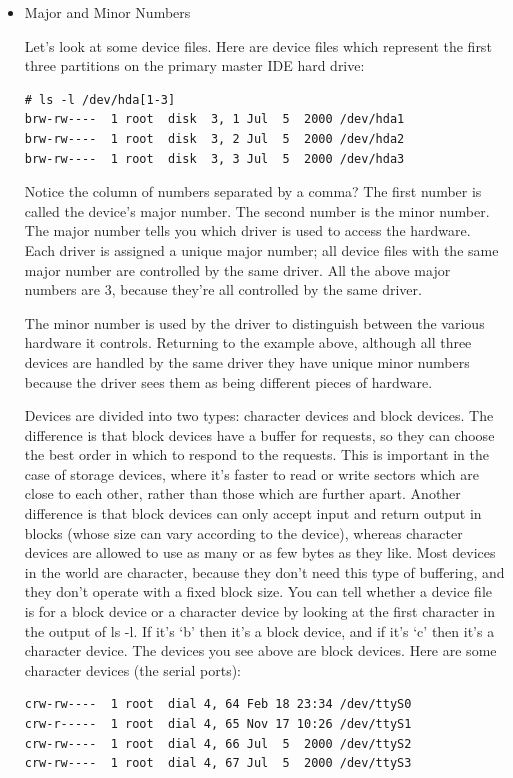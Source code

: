 \documentclass[11pt]{article}
\begin{document}
\begin{itemize}
\item Major and Minor Numbers
\label{sec-5-6-0-1}

Let's look at some device files. Here are device files which represent the first three partitions on the primary master IDE hard drive:

\begin{verbatim}
# ls -l /dev/hda[1-3]
brw-rw----  1 root  disk  3, 1 Jul  5  2000 /dev/hda1
brw-rw----  1 root  disk  3, 2 Jul  5  2000 /dev/hda2
brw-rw----  1 root  disk  3, 3 Jul  5  2000 /dev/hda3
\end{verbatim}

Notice the column of numbers separated by a comma? The first number is called the device's major number. The second number is the minor number. The major number tells you which driver is used to access the hardware. Each driver is assigned a unique major number; all device files with the same major number are controlled by the same driver. All the above major numbers are 3, because they're all controlled by the same driver.

The minor number is used by the driver to distinguish between the various hardware it controls. Returning to the example above, although all three devices are handled by the same driver they have unique minor numbers because the driver sees them as being different pieces of hardware.

Devices are divided into two types: character devices and block devices. The difference is that block devices have a buffer for requests, so they can choose the best order in which to respond to the requests. This is important in the case of storage devices, where it's faster to read or write sectors which are close to each other, rather than those which are further apart. Another difference is that block devices can only accept input and return output in blocks (whose size can vary according to the device), whereas character devices are allowed to use as many or as few bytes as they like. Most devices in the world are character, because they don't need this type of buffering, and they don't operate with a fixed block size. You can tell whether a device file is for a block device or a character device by looking at the first character in the output of ls -l. If it's `b' then it's a block device, and if it's `c' then it's a character device. The devices you see above are block devices. Here are some character devices (the serial ports):

\begin{verbatim}
crw-rw----  1 root  dial 4, 64 Feb 18 23:34 /dev/ttyS0
crw-r-----  1 root  dial 4, 65 Nov 17 10:26 /dev/ttyS1
crw-rw----  1 root  dial 4, 66 Jul  5  2000 /dev/ttyS2
crw-rw----  1 root  dial 4, 67 Jul  5  2000 /dev/ttyS3
\end{verbatim}


\end{itemize}
\end{document}
